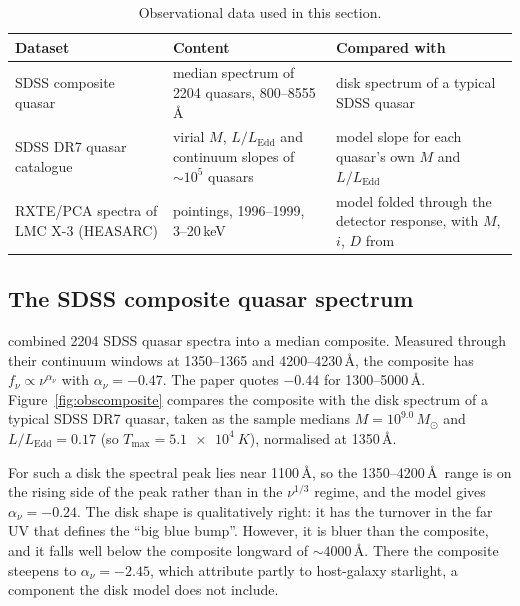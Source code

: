\documentclass[11pt,a4paper]{article}
\newcommand{\Msun}{M_\odot}
\newcommand{\LEdd}{L_{\mathrm{Edd}}}
\newcommand{\Tmax}{T_{\max}}
\begin{document}
\begin{table}[H]
  \centering
  \caption{Observational data used in this section.}
  \label{tab:obsdata}
  \small
  \begin{tabular}{@{}>{\raggedright\arraybackslash}p{3.8cm}>{\raggedright\arraybackslash}p{5.0cm}>{\raggedright\arraybackslash}p{6.4cm}@{}}
    \toprule
    Dataset & Content & Compared with \\
    \midrule
    SDSS composite quasar \citep{VandenBerk2001} & median spectrum of 2204 quasars, 800--8555\,\AA &
      disk spectrum of a typical SDSS quasar \\
    SDSS DR7 quasar catalogue \citep{Shen2011} & virial $M$, $L/\LEdd$ and continuum slopes of $\sim10^5$ quasars &
      model slope for each quasar's own $M$ and $L/\LEdd$ \\
    RXTE/PCA spectra of LMC X-3 (HEASARC) & 65 pointings, 1996--1999, 3--20\,keV &
      model folded through the detector response, with $M$, $i$, $D$ from \citet{Orosz2014} \\
    \bottomrule
  \end{tabular}
\end{table}

\subsection{The SDSS composite quasar spectrum}
\citet{VandenBerk2001} combined 2204 SDSS quasar spectra into a median
composite. Measured through their continuum windows at 1350--1365 and
4200--4230\,\AA, the composite has $f_\nu\propto\nu^{\alpha_\nu}$ with
$\alpha_\nu=-0.47$. The paper quotes $-0.44$ for 1300--5000\,\AA.
Figure~\ref{fig:obscomposite} compares the composite with the disk spectrum
of a typical SDSS DR7 quasar, taken as the sample medians
$M=10^{9.0}\,\Msun$ and $L/\LEdd=0.17$ (so $\Tmax=\SI{5.1e4}{K}$), normalised
at 1350\,\AA.

For such a disk the spectral peak lies near 1100\,\AA, so the 1350--4200\,\AA\
range is on the rising side of the peak rather than in the $\nu^{1/3}$
regime, and the model gives $\alpha_\nu=-0.24$. The disk shape is
qualitatively right: it has the turnover in the far UV that defines the
``big blue bump''. However, it is bluer than the composite, and it falls well
below the composite longward of $\sim4000$\,\AA. There the composite
steepens to $\alpha_\nu=-2.45$, which \citet{VandenBerk2001} attribute partly
to host-galaxy starlight, a component the disk model does not include.
\end{document}
